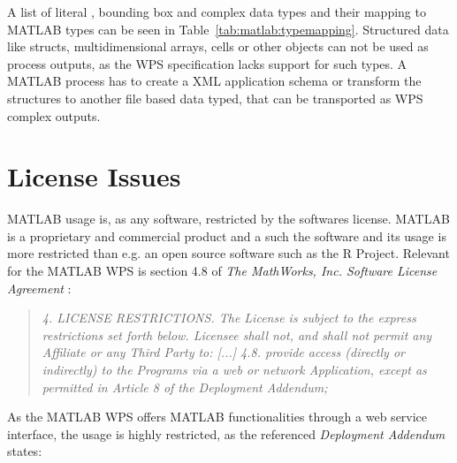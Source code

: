 		A list of literal \citep[based on][]{w3c:xmldatatypes}, bounding box and complex data types and their mapping to MATLAB types can be seen in Table~\ref{tab:matlab:typemapping}. Structured data like structs, multidimensional arrays, cells or other objects can not be used as process outputs, as the \ac{WPS} specification lacks support for such types. A MATLAB process has to create a XML application schema or transform the structures to another file based data typed, that can be transported as WPS complex outputs.

	\section{License Issues}
		MATLAB usage is, as any software, restricted by the softwares license. MATLAB is a proprietary and commercial product and a such the software and its usage is more restricted than e.g. an open source software such as the R Project. Relevant for the MATLAB WPS is section 4.8 of \emph{The MathWorks, Inc. Software License Agreement} \citep{matlablicense}:
		\begin{quote}\itshape\small
			4. LICENSE RESTRICTIONS.  The License is subject to the express restrictions
			set forth below. Licensee shall not, and shall not permit any Affiliate or any
			Third Party to:
				[...]
				4.8. provide access (directly or indirectly) to the Programs via a web or
				network Application, except as permitted in Article 8 of the Deployment
				Addendum;
		\end{quote}

		As the MATLAB WPS offers MATLAB functionalities through a web service interface, the usage is highly restricted, as the referenced \emph{Deployment Addendum} \citep{matlablicense} states:


